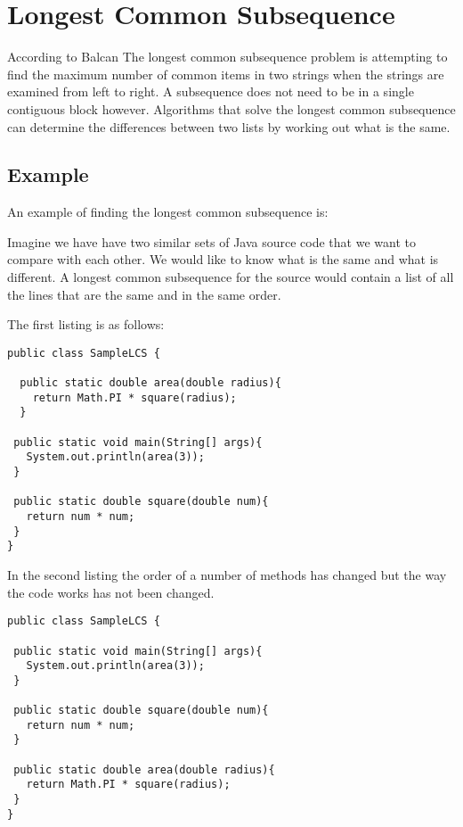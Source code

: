 \section{Longest Common Subsequence}
According to Balcan \cite{Balcan}The longest common subsequence problem is attempting to find the maximum number of common items in two strings when the strings are examined from left to right. A subsequence does not need to be in a single contiguous block however. Algorithms that solve the longest common subsequence can determine the differences between two lists by working out what is the same.   

\subsection{Example}
An example of finding the longest common subsequence is:

Imagine we have have two similar sets of Java source code that we want to compare with each other.  
We would like to know what is the same and what is different.
A longest common subsequence for the source would contain a list of all the lines that are the same and in the same order.

The first listing is as follows:

\begin{lstlisting}
public class SampleLCS { 

  public static double area(double radius){
    return Math.PI * square(radius);
  }
  
 public static void main(String[] args){
   System.out.println(area(3));
 }
 
 public static double square(double num){
   return num * num;
 }
}

\end{lstlisting}

In the second listing the order of a number of methods has changed but the way the code works has not been changed.

\begin{lstlisting}
public class SampleLCS {

 public static void main(String[] args){
   System.out.println(area(3));
 }
 
 public static double square(double num){
   return num * num;
 }
 
 public static double area(double radius){
   return Math.PI * square(radius);
 }
}

\end{lstlisting}

